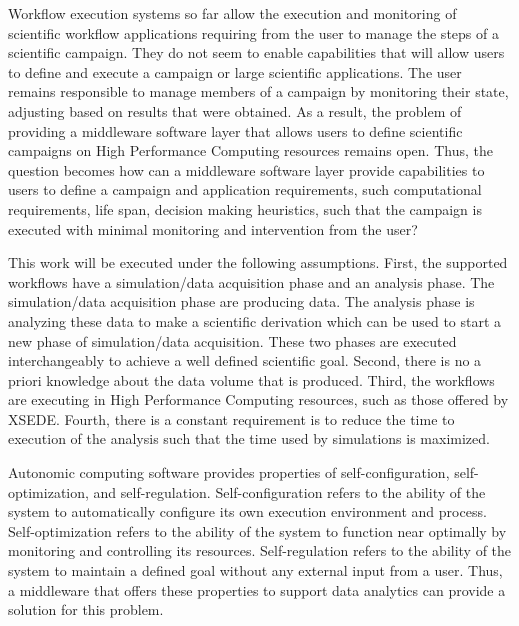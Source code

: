 
Workflow execution systems so far allow the execution and monitoring of scientific workflow applications requiring from the user to manage the steps of a scientific campaign. They do not seem to enable capabilities that will allow users to define and execute a campaign or large scientific applications. The user remains responsible to manage members of a campaign by monitoring their state, adjusting based on results that were obtained. As a result, the problem of providing a middleware software layer that allows users to define scientific campaigns on High Performance Computing resources remains open. Thus, the question becomes how can a middleware software layer provide capabilities to users to define a campaign and application requirements, such computational requirements, life span, decision making heuristics, such that the campaign is executed with minimal monitoring and intervention from the user?

This work will be executed under the following assumptions. First, the supported workflows have a simulation/data acquisition phase and an analysis phase. The simulation/data acquisition phase are producing data. The analysis phase is analyzing these data to make a scientific derivation which can be used to start a new phase of simulation/data acquisition. These two phases are executed interchangeably to achieve a well defined scientific goal. Second, there is no a priori knowledge about the data volume that is produced. Third, the workflows are executing in High Performance Computing resources, such as those offered by XSEDE. Fourth, there is a constant requirement is to reduce the time to execution of the analysis such that the time used by simulations is maximized.


Autonomic computing software provides properties of self-configuration, self-optimization, and self-regulation. Self-configuration refers to the ability of the system to automatically configure its own execution environment and process. Self-optimization refers to the ability of the system to function near optimally by monitoring and controlling its resources. Self-regulation refers to the ability of the system to maintain a defined goal without any external input from a user. Thus, a middleware that offers these properties to support data analytics can provide a solution for this problem.

